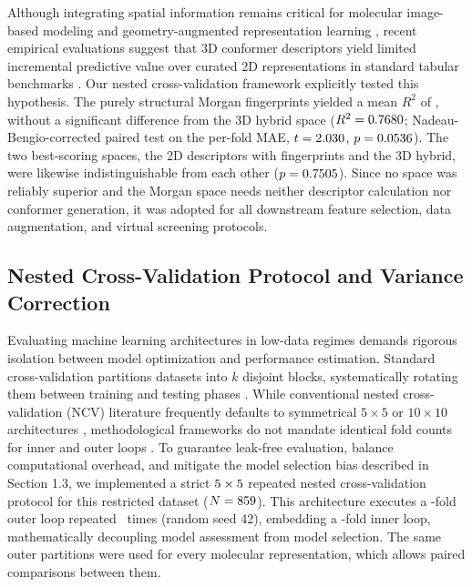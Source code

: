 Although integrating spatial information remains critical for molecular image-based modeling \cite{matsu2023} and geometry-augmented representation learning \cite{yanan2024}, recent empirical evaluations suggest that 3D conformer descriptors yield limited incremental predictive value over curated 2D representations in standard tabular benchmarks \cite{tiwari2026}. Our nested cross-validation framework explicitly tested this hypothesis. The purely structural Morgan fingerprints yielded a mean $R^2$ of \MorganRTwoMean, without a significant difference from the 3D hybrid space ($R^2 = 0.7680$; Nadeau-Bengio-corrected paired test on the per-fold MAE, $t = 2.030$, $p = 0.0536$). The two best-scoring spaces, the 2D descriptors with fingerprints and the 3D hybrid, were likewise indistinguishable from each other ($p = 0.7505$). Since no space was reliably superior and the Morgan space needs neither descriptor calculation nor conformer generation, it was adopted for all downstream feature selection, data augmentation, and virtual screening protocols.


\subsection{Nested Cross-Validation Protocol and Variance Correction}
\label{sec:materials_ncv}

Evaluating machine learning architectures in low-data regimes demands rigorous isolation between model optimization and performance estimation. Standard cross-validation partitions datasets into $k$ disjoint blocks, systematically rotating them between training and testing phases \cite{calle2025, krstajic2014}. While conventional nested cross-validation (NCV) literature frequently defaults to symmetrical $5 \times 5$ or $10 \times 10$ architectures \cite{calle2025, lewis2023, wainer2021}, methodological frameworks do not mandate identical fold counts for inner and outer loops \cite{krstajic2014}. To guarantee leak-free evaluation, balance computational overhead, and mitigate the model selection bias described in Section 1.3, we implemented a strict $5 \times 5$ repeated nested cross-validation protocol for this restricted dataset ($N = 859$). This architecture executes a \OuterKFolds-fold outer loop repeated \OuterRepeats\ times (random seed 42), embedding a \InnerKFolds-fold inner loop, mathematically decoupling model assessment from model selection. The same outer partitions were used for every molecular representation, which allows paired comparisons between them.

